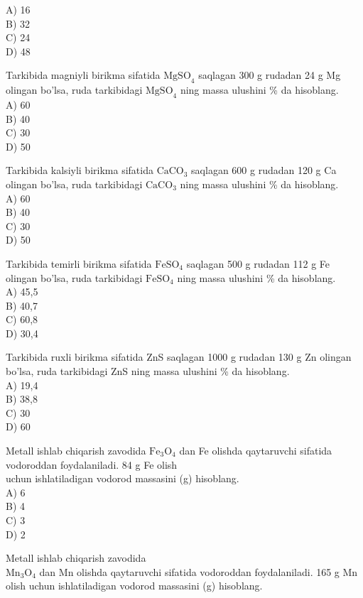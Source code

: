A) 16\\
B) 32\\
C) 24\\
D) 48
  \item Tarkibida magniyli birikma sifatida $\mathrm{MgSO}_{4}$ saqlagan 300 g rudadan 24 g Mg olingan bo'lsa, ruda tarkibidagi $\mathrm{MgSO}_{4}$ ning massa ulushini \% da hisoblang.\\
A) 60\\
B) 40\\
C) 30\\
D) 50
  \item Tarkibida kalsiyli birikma sifatida $\mathrm{CaCO}_{3}$ saqlagan 600 g rudadan 120 g Ca olingan bo'lsa, ruda tarkibidagi $\mathrm{CaCO}_{3}$ ning massa ulushini \% da hisoblang.\\
A) 60\\
B) 40\\
C) 30\\
D) 50
  \item Tarkibida temirli birikma sifatida $\mathrm{FeSO}_{4}$ saqlagan 500 g rudadan 112 g Fe olingan bo'lsa, ruda tarkibidagi $\mathrm{FeSO}_{4}$ ning massa ulushini \% da hisoblang.\\
A) 45,5\\
B) 40,7\\
C) 60,8\\
D) 30,4
  \item Tarkibida ruxli birikma sifatida ZnS saqlagan 1000 g rudadan 130 g Zn olingan bo'lsa, ruda tarkibidagi ZnS ning massa ulushini \% da hisoblang.\\
A) 19,4\\
B) 38,8\\
C) 30\\
D) 60
  \item Metall ishlab chiqarish zavodida $\mathrm{Fe}_{3} \mathrm{O}_{4}$ dan Fe olishda qaytaruvchi sifatida vodoroddan foydalaniladi. 84 g Fe olish\\
uchun ishlatiladigan vodorod massasini (g) hisoblang.\\
A) 6\\
B) 4\\
C) 3\\
D) 2
  \item Metall ishlab chiqarish zavodida\\
$\mathrm{Mn}_{3} \mathrm{O}_{4}$ dan Mn olishda qaytaruvchi sifatida vodoroddan foydalaniladi. 165 g Mn olish uchun ishlatiladigan vodorod massasini (g) hisoblang.\\
